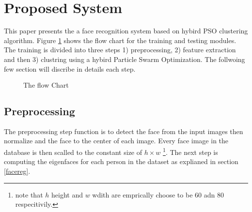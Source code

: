 \documentclass[a4paper,twoside]{article}
\begin{document}
\section{Proposed System}
\label{sec:proposed}

This paper presents the a face recognition system based on hybird PSO clustering algorithm. Figure \ref{Blockchart} shows the flow chart for the training and testing modules. The training is divided into three steps 1) preprocessing, 2) feature extraction and then 3) clustring using a hybird Particle Swarm Optimization. The follwoing few section will discribe in details each step.  
  
\begin{figure}
 \begin{center}
 \centering

\caption{ The flow Chart}
\label{Blockchart}
 \end{center}\end{figure}
\subsection{Preprocessing}
The preprocessing step function is to detect the face from the input images
then normalize and the face to the center of each  image.  Every face
image in the database is  then scalled to the constant size of $h \times w$
\footnote{ note that  $h$ height and $w$ wdith are emprically choose to be 60
adn 80 respecitivily.}. The next step is computing the eigenfaces for each
person in the dataset as explianed in section \ref{facereg}.
\end{document}
